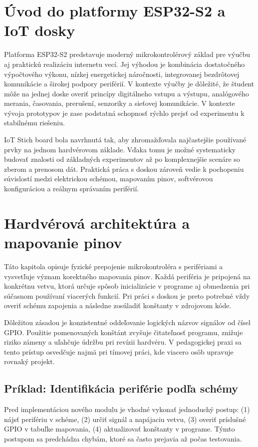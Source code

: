 \section{Úvod do platformy ESP32-S2 a IoT dosky}
Platforma ESP32-S2 predstavuje moderný mikrokontrolérový základ pre výučbu aj praktickú realizáciu internetu vecí. Jej výhodou je kombinácia dostatočného výpočtového výkonu, nízkej energetickej náročnosti, integrovanej bezdrôtovej komunikácie a širokej podpory periférií. V kontexte výučby je dôležité, že študent môže na jednej doske overiť princípy digitálneho vstupu a výstupu, analógového merania, časovania, prerušení, senzoriky a sieťovej komunikácie. V kontexte vývoja prototypov je zase podstatná schopnosť rýchlo prejsť od experimentu k stabilnému riešeniu.

IoT Stich board bola navrhnutá tak, aby zhromažďovala najčastejšie používané prvky na jednom hardvérovom základe. Vďaka tomu je možné systematicky budovať znalosti od základných experimentov až po komplexnejšie scenáre so zberom a prenosom dát. Praktická práca s doskou zároveň vedie k pochopeniu súvislostí medzi elektrickou schémou, mapovaním pinov, softvérovou konfiguráciou a reálnym správaním periférií.

\section{Hardvérová architektúra a mapovanie pinov}
Táto kapitola opisuje fyzické prepojenie mikrokontroléra s perifériami a vysvetľuje význam korektného mapovania pinov. Každá periféria je pripojená na konkrétnu vetvu, ktorá určuje spôsob inicializácie v programe aj obmedzenia pri súčasnom používaní viacerých funkcií. Pri práci s doskou je preto potrebné vždy overiť schému zapojenia a následne zosúladiť konštanty v zdrojovom kóde.

Dôležitou zásadou je konzistentné oddeľovanie logických názvov signálov od čísel GPIO. Použitie pomenovaných konštánt zvyšuje čitateľnosť programu, znižuje riziko zámeny a uľahčuje údržbu pri revízii hardvéru. V pedagogickej praxi sa tento prístup osvedčuje najmä pri tímovej práci, kde viacero osôb upravuje rovnaký projekt.

\subsection{Príklad: Identifikácia periférie podľa schémy}
Pred implementáciou nového modulu je vhodné vykonať jednoduchý postup: (1) nájsť perifériu v schéme, (2) určiť signál a napájaciu vetvu, (3) overiť príslušné GPIO v tabuľke mapovania, (4) aktualizovať konštanty v programe. Týmto postupom sa predchádza chybám, ktoré sa často prejavia až počas testovania.

